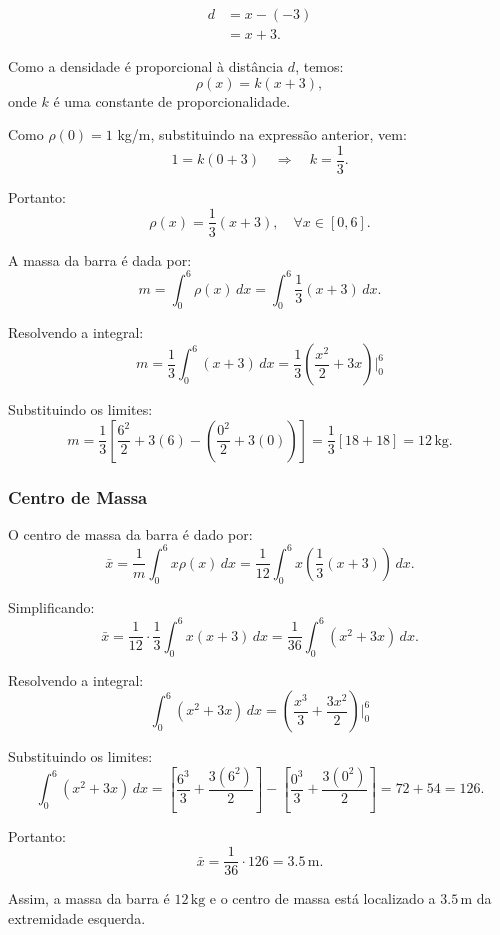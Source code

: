 \documentclass[12pt,a4paper]{report}
\begin{document}
\begin{align*}
    d &= x - (-3)\\ 
    &= x + 3.
\end{align*}



\noindent
Como a densidade \'e proporcional \`a dist\^ancia $d$, temos:
\[
\rho(x) = k(x + 3),
\]
onde $k$ \'e uma constante de proporcionalidade.

\noindent
Como $\rho(0) = 1$ kg/m, substituindo na express\~ao anterior, vem:
\[
1 = k(0 + 3) \quad \Rightarrow \quad k = \frac{1}{3}.
\]

\noindent
Portanto:
\[
\rho(x) = \frac{1}{3}(x + 3), \quad \forall x \in [0, 6].
\]

\noindent
A massa da barra \'e dada por:
\[
m = \int_{0}^{6} \rho(x) \, dx = \int_{0}^{6} \frac{1}{3}(x + 3) \, dx.
\]

\noindent
Resolvendo a integral:
\[
m = \frac{1}{3} \int_{0}^{6} (x + 3) \, dx = \frac{1}{3} \left( \frac{x^2}{2} + 3x \right)\Bigg|_{0}^{6}
\]

\noindent
Substituindo os limites:
\[
m = \frac{1}{3} \left[ \frac{6^2}{2} + 3(6) - \left( \frac{0^2}{2} + 3(0) \right) \right] = \frac{1}{3} \left[ 18 + 18 \right] = 12 \, \text{kg}.
\]

\subsubsection*{Centro de Massa}

\noindent
O centro de massa da barra \'e dado por:
\[
\bar{x} = \frac{1}{m} \int_{0}^{6} x \rho(x) \, dx = \frac{1}{12} \int_{0}^{6} x \left( \frac{1}{3}(x + 3) \right) \, dx.
\]

\noindent
Simplificando:
\[
\bar{x} = \frac{1}{12} \cdot \frac{1}{3} \int_{0}^{6} x(x + 3) \, dx = \frac{1}{36} \int_{0}^{6} (x^2 + 3x) \, dx.
\]

\noindent
Resolvendo a integral:
\[
\int_{0}^{6} (x^2 + 3x) \, dx = \left( \frac{x^3}{3} + \frac{3x^2}{2} \right)\Bigg|_{0}^{6}
\]

\noindent
Substituindo os limites:
\[
\int_{0}^{6} (x^2 + 3x) \, dx = \left[ \frac{6^3}{3} + \frac{3(6^2)}{2} \right] - \left[ \frac{0^3}{3} + \frac{3(0^2)}{2} \right] = 72 + 54 = 126.
\]

\noindent
Portanto:
\[
\bar{x} = \frac{1}{36} \cdot 126 = 3.5 \, \text{m}.
\]

\noindent
Assim, a massa da barra \'e $12 \, \text{kg}$ e o centro de massa est\'a localizado a $3.5 \, \text{m}$ da extremidade esquerda.
\end{document}
